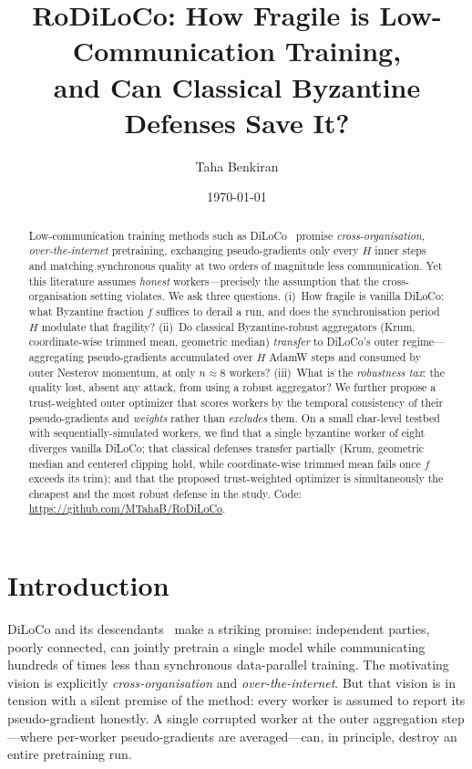 \documentclass[11pt]{article}
\title{\textbf{RoDiLoCo}: How Fragile is Low-Communication Training,\\ and Can Classical Byzantine Defenses Save It?}
\author{Taha Benkiran}
\date{\today}
\begin{document}
\maketitle

\begin{abstract}
Low-communication training methods such as DiLoCo~\citep{diloco2023} promise
\emph{cross-organisation}, \emph{over-the-internet} pretraining, exchanging pseudo-gradients
only every $H$ inner steps and matching synchronous quality at two orders of magnitude less
communication. Yet this literature assumes \emph{honest} workers---precisely the assumption
that the cross-organisation setting violates. We ask three questions. (i)~How fragile is
vanilla DiLoCo: what Byzantine fraction $f$ suffices to derail a run, and does the
synchronisation period $H$ modulate that fragility? (ii)~Do classical Byzantine-robust
aggregators (Krum, coordinate-wise trimmed mean, geometric median) \emph{transfer} to
DiLoCo's outer regime---aggregating pseudo-gradients accumulated over $H$ AdamW steps and
consumed by outer Nesterov momentum, at only $n\!\approx\!8$ workers? (iii)~What is the
\emph{robustness tax}: the quality lost, absent any attack, from using a robust aggregator?
We further propose a trust-weighted outer optimizer that scores workers by the temporal
consistency of their pseudo-gradients and \emph{weights} rather than \emph{excludes} them.
On a small char-level testbed with sequentially-simulated workers, we find that a single
byzantine worker of eight diverges vanilla DiLoCo; that classical defenses transfer partially
(Krum, geometric median and centered clipping hold, while coordinate-wise trimmed mean fails
once $f$ exceeds its trim); and that the proposed trust-weighted optimizer is simultaneously
the cheapest and the most robust defense in the study. Code:
\url{https://github.com/MTahaB/RoDiLoCo}.
\end{abstract}

\section{Introduction}
\label{sec:intro}
DiLoCo and its descendants~\citep{diloco2023,streamingdiloco2025,dilocoscaling2025} make a
striking promise: independent parties, poorly connected, can jointly pretrain a single model
while communicating hundreds of times less than synchronous data-parallel training. The
motivating vision is explicitly \emph{cross-organisation} and \emph{over-the-internet}. But
that vision is in tension with a silent premise of the method: every worker is assumed to
report its pseudo-gradient honestly. A single corrupted worker at the outer aggregation
step---where per-worker pseudo-gradients are averaged---can, in principle, destroy an entire
pretraining run.
\end{document}
